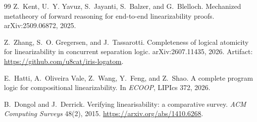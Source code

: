 \documentclass[11pt]{article}
\begin{document}
\begin{thebibliography}{99}
Z.~Kent, U.~Y. Yavuz, S.~Jayanti, S.~Balzer, and G.~Blelloch.
\newblock Mechanized metatheory of forward reasoning for end-to-end
  linearizability proofs.
\newblock arXiv:2509.06872, 2025.

Z.~Zhang, S.~O. Gregersen, and J.~Tassarotti.
\newblock Completeness of logical atomicity for linearizability in
  concurrent separation logic.
\newblock arXiv:2607.11435, 2026.
\newblock Artifact: \url{https://github.com/u8cat/iris-logatom}.

E.~Hatti, A.~Oliveira Vale, Z.~Wang, Y.~Feng, and Z.~Shao.
\newblock A complete program logic for compositional linearizability.
\newblock In \emph{ECOOP}, LIPIcs 372, 2026.

B.~Dongol and J.~Derrick.
\newblock Verifying linearisability: a comparative survey.
\newblock \emph{ACM Computing Surveys} 48(2), 2015.
\newblock \url{https://arxiv.org/abs/1410.6268}.

\end{thebibliography}
\end{document}
